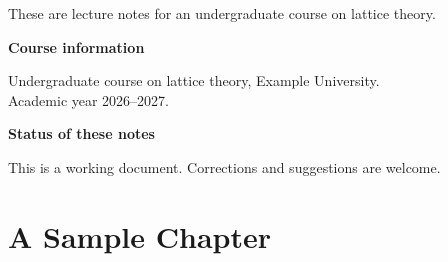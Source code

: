 

\showtodostrue
\showcommentstrue


\subtitle{Lecture notes}


\hypersetup{pageanchor=false}
\maketitle

\thispagestyle{empty}
\noindent
These are lecture notes for an undergraduate course on lattice theory.

\vspace{2\baselineskip}

\noindent\textbf{Course information}\par
\smallskip
\noindent
Undergraduate course on lattice theory, Example University.\\
Academic year 2026--2027.

\vspace{\baselineskip}

\noindent\textbf{Status of these notes}\par
\smallskip
\noindent
This is a working document. Corrections and suggestions are welcome.

\par
\vfill
\printauthorinfo
\clearpage

\hypersetup{pageanchor=true}
\tableofcontents
\clearpage


\chapter{A Sample Chapter}

